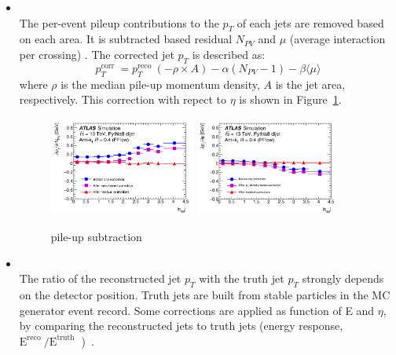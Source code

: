 \begin{itemize}
    \item \textbf{} \\
    The per-event pileup contributions to the $p_T$ of each jets are removed based on each area. It is subtracted based residual $N_{PV}$ and $\mu$ (average interaction per crossing) \cite{JETM-2018-05}.
    The corrected jet $p_T$ is described as:
    \begin{equation}
     p_{T}^{\text {corr }}=p_{T}^{\text {reco }}(-\rho \times A)-\alpha\left(N_{P V}-1\right)-\beta\langle\mu\rangle
    \end{equation}
    where $\rho$ is the median pile-up momentum density, $A$ is the jet area, respectively.
    This correction with repect to $\eta$ is shown in Figure~\ref{fig:pileup}.
    \begin{figure}[tbp]
    \begin{center}
    \includegraphics[width=0.45\textwidth,keepaspectratio]{figures/Reconstruction/intimepileup}
    \includegraphics[width=0.45\textwidth,keepaspectratio]{figures/Reconstruction/outtimepileup}
    \caption{
    pile-up subtraction \cite{JETM-2018-05}
    }
    \label{fig:pileup}
    \end{center}
    \end{figure}
    \item \textbf{} \\
    The ratio of the reconstructed jet $p_T$ with the truth jet $p_T$ strongly depends on the detector position. 
    Truth jets are built from stable particles in the MC generator event record. 
    Some corrections are applied as function of E and $\eta$, by comparing the reconstructed jets to truth jets (energy response, $\mathrm{E}^{\text {reco }} / \mathrm{E}^{\text {truth }}$ )~\cite{JETM-2018-05}.

\end{itemize}
